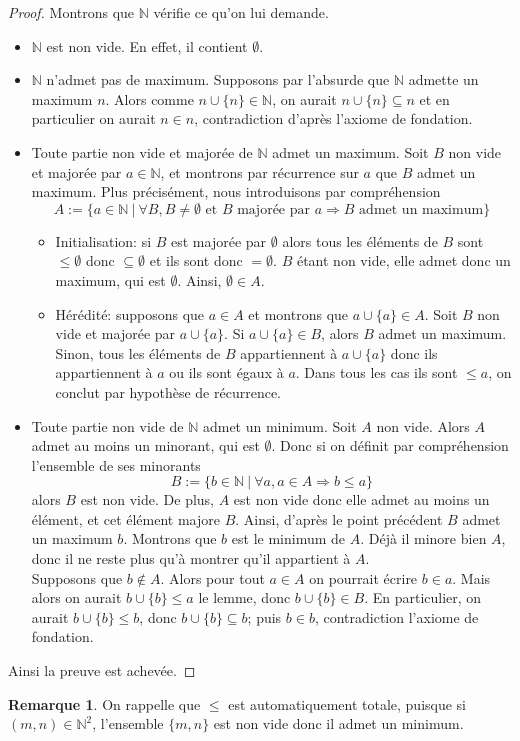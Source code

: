 \documentclass[french]{book}
\theoremstyle{plain}
\theoremstyle{definition}
\newtheorem{rmq}{Remarque}[chapter]
\theoremstyle{remark}
\begin{document}
\begin{proof}
	Montrons que $\mathbb{N}$ vérifie ce qu'on lui demande.
	\begin{itemize}
		\item $\mathbb{N}$ est non vide. En effet, il contient $\emptyset$.
		\item $\mathbb{N}$ n'admet pas de maximum. Supposons par l'absurde que $\mathbb{N}$ admette un maximum $n$. Alors comme $n \cup \{n\} \in \mathbb{N}$, on aurait $n \cup \{n\} \subseteq n$ et en particulier on aurait $n \in n$, contradiction d'après l'axiome de fondation.
		\item Toute partie non vide et majorée de $\mathbb{N}$ admet un maximum. Soit $B$ non vide et majorée par $a \in \mathbb{N}$, et montrons par récurrence sur $a$ que $B$ admet un maximum. Plus précisément, nous introduisons par compréhension $$A := \{a \in \mathbb{N}\ |\ \forall B, B \neq \emptyset \text{ et } B \text{ majorée par } a \Rightarrow B \text{ admet un maximum} \}$$
		\begin{itemize}
			\item[--]Initialisation: si $B$ est majorée par $\emptyset$ alors tous les éléments de $B$ sont $\leqslant \emptyset$ donc $\subseteq \emptyset$ et ils sont donc $=\emptyset$. $B$ étant non vide, elle admet donc un maximum, qui est $\emptyset$. Ainsi, $\emptyset \in A$.
			\item[--]Hérédité: supposons que $a \in A$ et montrons que $a \cup \{a\} \in A$. Soit $B$ non vide et majorée par $a \cup \{a\}$. Si $a \cup \{a\} \in B$, alors $B$ admet un maximum. Sinon, tous les éléments de $B$ appartiennent à $a \cup \{a\}$ donc ils appartiennent à $a$ ou ils sont égaux à $a$. Dans tous les cas ils sont $\leqslant a$, on conclut par hypothèse de récurrence.
		\end{itemize}
		\item Toute partie non vide de $\mathbb{N}$ admet un minimum. Soit $A$ non vide. Alors $A$ admet au moins un minorant, qui est $\emptyset$. Donc si on définit par compréhension l'ensemble de ses minorants $$B := \{b \in \mathbb{N}\ |\ \forall a, a \in A \Rightarrow b \leqslant a\}$$ alors $B$ est non vide. De plus, $A$ est non vide donc elle admet au moins un élément, et cet élément majore $B$. Ainsi, d'après le point précédent $B$ admet un maximum $b$. Montrons que $b$ est le minimum de $A$. Déjà il minore bien $A$, donc il ne reste plus qu'à montrer qu'il appartient à $A$.\\ Supposons que $b \notin A$. Alors pour tout $a \in A$ on pourrait écrire $b \in a$. Mais alors on aurait $b \cup \{b\} \leqslant a$ le lemme, donc $b \cup \{b\} \in B$. En particulier, on aurait $b \cup \{b\} \leqslant b$, donc $b \cup \{b\} \subseteq b$; puis $b \in b$, contradiction l'axiome de fondation.
	\end{itemize}
	Ainsi la preuve est achevée.
\end{proof}
\begin{rmq}
	On rappelle que $\leqslant$ est automatiquement totale, puisque si $(m,n) \in \mathbb{N}^2$, l'ensemble $\{m,n\}$ est non vide donc il admet un minimum.
\end{rmq}
\end{document}
